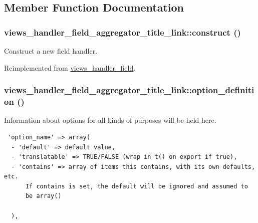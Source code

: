 \subsection{Member Function Documentation}
\hypertarget{classviews__handler__field__aggregator__title__link_bcde91e341b70cc842fec304c7de8376}{
\subsubsection[{construct}]{\setlength{\rightskip}{0pt plus 5cm}views\_\-handler\_\-field\_\-aggregator\_\-title\_\-link::construct ()}}
\label{classviews__handler__field__aggregator__title__link_bcde91e341b70cc842fec304c7de8376}


Construct a new field handler. 

Reimplemented from \hyperlink{classviews__handler__field_3d50050864c255b71c842972a45d39f6}{views\_\-handler\_\-field}.\hypertarget{classviews__handler__field__aggregator__title__link_92ccca19cd954e8522c77dd75119d42a}{
\subsubsection[{option\_\-definition}]{\setlength{\rightskip}{0pt plus 5cm}views\_\-handler\_\-field\_\-aggregator\_\-title\_\-link::option\_\-definition ()}}
\label{classviews__handler__field__aggregator__title__link_92ccca19cd954e8522c77dd75119d42a}


Information about options for all kinds of purposes will be held here. 

\begin{Code}\begin{verbatim} 'option_name' => array(
  - 'default' => default value,
  - 'translatable' => TRUE/FALSE (wrap in t() on export if true),
  - 'contains' => array of items this contains, with its own defaults, etc.
      If contains is set, the default will be ignored and assumed to
      be array()

  ),
\end{verbatim}
\end{Code}

